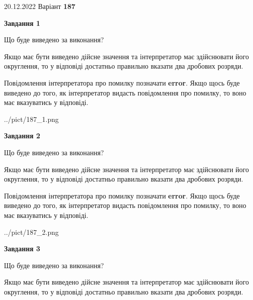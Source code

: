 \documentclass[12pt, ukrainian]{article}
\begin{document}
{20.12.2022 Варіант \No \textbf { 187 }\par}
{
\begin {Large}

{\begin {center}\textbf{Завдання 1}\end {center}}\par
Що буде виведено за виконання? \par

Якщо має бути виведено дійсне значення та інтерпретатор має здійснювати його округлення, 
то у відповіді достатньо правильно вказати два дробових розряди.

Повідомлення інтерпретатора про помилку позначати \textbf{error}.
Якщо щось буде виведено до того, як інтерпретатор видасть повідомлення про помилку, 
то воно має вказуватись у відповіді. \par

\begin{center}
	{../pict/187_1.png}
\end{center}
\newpage

{\begin {center}\textbf{Завдання 2}\end {center}}\par
Що буде виведено за виконання? \par

Якщо має бути виведено дійсне значення та інтерпретатор має здійснювати його округлення, 
то у відповіді достатньо правильно вказати два дробових розряди.

Повідомлення інтерпретатора про помилку позначати \textbf{error}.
Якщо щось буде виведено до того, як інтерпретатор видасть повідомлення про помилку, 
то воно має вказуватись у відповіді. \par

\begin{center}
	{../pict/187_2.png}
\end{center}
\newpage

{\begin {center}\textbf{Завдання 3}\end {center}}\par
Що буде виведено за виконання? \par

Якщо має бути виведено дійсне значення та інтерпретатор має здійснювати його округлення, 
то у відповіді достатньо правильно вказати два дробових розряди.


\end{Large}}
\end{document}
